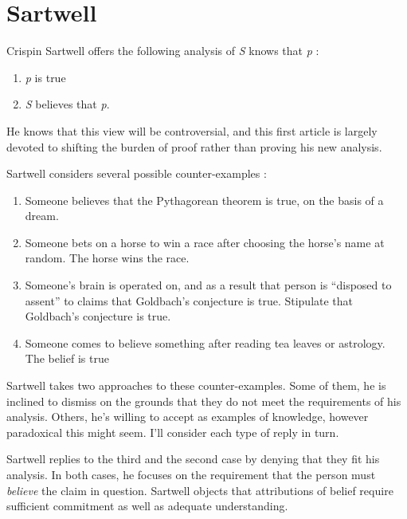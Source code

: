 \section{Sartwell}

Crispin Sartwell offers the following analysis of \textit{S} knows that \textit{p} \parencite[157]{sartwell1991}:

\begin{enumerate}
    \item \textit{p} is true
    \item \textit{S} believes that \textit{p}.
\end{enumerate}

He knows that this view will be controversial, and this first article is largely devoted to shifting the burden of proof rather than proving his new analysis.

Sartwell considers several possible counter-examples \parencite[158--159]{sartwell1991}:

\begin{enumerate}
    \item Someone believes that the Pythagorean theorem is true, on the basis of a dream.
    \item Someone bets on a horse to win a race after choosing the horse's name at random. The horse wins the race.
    \item Someone's brain is operated on, and as a result that person is ``disposed to assent'' to claims that Goldbach's conjecture is true. Stipulate that Goldbach's conjecture is true.
    \item Someone comes to believe something after reading tea leaves or astrology. The belief is true
\end{enumerate}

Sartwell takes two approaches to these counter-examples. Some of them, he is inclined to dismiss on the grounds that they do not meet the requirements of his analysis. Others, he's willing to accept as examples of knowledge, however paradoxical this might seem. I'll consider each type of reply in turn.

Sartwell replies to the third and the second case by denying that they fit his analysis. In both cases, he focuses on the requirement that the person must \textit{believe} the claim in question. Sartwell objects that attributions of belief require sufficient commitment as well as adequate understanding.

